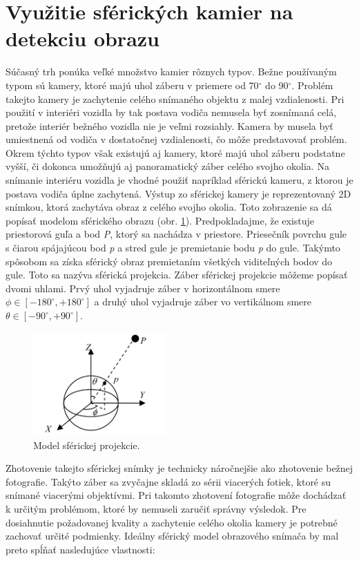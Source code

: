 \documentclass[slovak,master,dept460,male,cpp,cpdeclaration]{diploma}
\begin{document}
\section{Využitie sférických kamier na detekciu obrazu}
\label{sec:Spherical cameras}
Súčasný trh ponúka veľké množstvo kamier rôznych typov. Bežne používaným typom sú kamery, ktoré majú  uhol záberu v priemere  od 70$^\circ$ do 90$^\circ$. Problém takejto kamery je zachytenie celého snímaného objektu z malej vzdialenosti. Pri použití v interiéri vozidla by tak  postava vodiča nemusela byť zosnímaná celá, pretože interiér bežného vozidla nie je veľmi rozsiahly. Kamera by musela byť umiestnená od vodiča v dostatočnej vzdialenosti, čo môže predstavovať problém. Okrem týchto typov však existujú aj kamery, ktoré majú uhol záberu podstatne vyšší, či dokonca umožňujú aj panoramatický záber celého svojho okolia. Na snímanie interiéru vozidla je vhodné použiť napríklad sférickú kameru, z ktorou je postava vodiča úplne zachytená.
Výstup zo sférickej kamery je reprezentovaný 2D snímkou, ktorá  zachytáva obraz z celého svojho okolia. Toto zobrazenie sa dá popísať  modelom sférického obrazu (obr. \ref{fig:sphericalModel}). Predpokladajme, že existuje priestorová guľa a bod \textit{P}, ktorý sa nachádza v priestore. Priesečník povrchu gule s čiarou spájajúcou bod \textit{p} a stred gule je premietanie bodu \textit{p} do gule. Takýmto spôsobom sa získa sférický obraz premietaním všetkých viditeľných bodov do gule. Toto sa nazýva sférická projekcia. Záber sférickej projekcie  môžeme popísať dvomi uhlami. Prvý uhol vyjadruje záber v horizontálnom smere $ \phi \in [-180^\circ , +180^\circ ]$ a druhý uhol vyjadruje záber vo vertikálnom smere  $\theta \in [-90^\circ , +90^\circ ]$.
\begin{figure}[H]
	\centering
	\includegraphics[width=0.45\textwidth]{Figures/sphericalModel.png}
	\caption{Model sférickej projekcie.\cite{li2006full}}
	\label{fig:sphericalModel}
\end{figure}
Zhotovenie takejto sférickej snímky je technicky  náročnejšie ako zhotovenie bežnej fotografie. Takýto záber sa zvyčajne skladá zo sérii viacerých fotiek, ktoré su snímané viacerými objektívmi. Pri takomto zhotovení fotografie môže dochádzať k určitým problémom, ktoré by nemuseli zaručiť správny výsledok. Pre dosiahnutie požadovanej kvality a zachytenie  celého okolia kamery je potrebné zachovať určité podmienky. Ideálny sférický model obrazového snímača by mal preto spĺňať nasledujúce vlastnosti:
\end{document}
